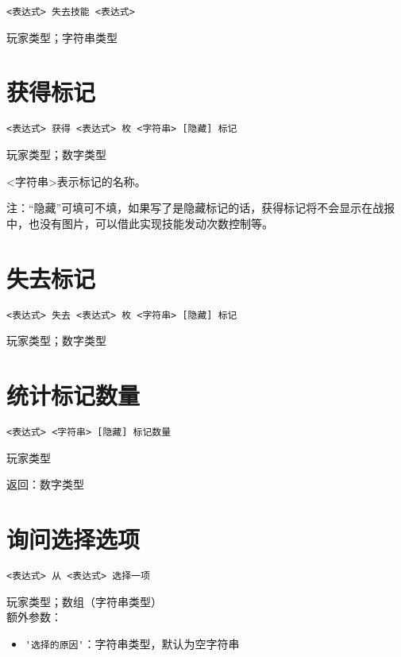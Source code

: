 \begin{verbatim}
<表达式> 失去技能 <表达式>
\end{verbatim}

玩家类型；字符串类型

\section{获得标记}

\begin{verbatim}
<表达式> 获得 <表达式> 枚 <字符串> [隐藏] 标记
\end{verbatim}

玩家类型；数字类型

<字符串>表示标记的名称。

注：“隐藏”可填可不填，如果写了是隐藏标记的话，获得标记将不会显示在战报中，也没有图片，可以借此实现技能发动次数控制等。

\section{失去标记}

\begin{verbatim}
<表达式> 失去 <表达式> 枚 <字符串> [隐藏] 标记
\end{verbatim}

玩家类型；数字类型

\section{统计标记数量}

\begin{verbatim}
<表达式> <字符串> [隐藏] 标记数量
\end{verbatim}

玩家类型

返回：数字类型

\section{询问选择选项}

\begin{verbatim}
<表达式> 从 <表达式> 选择一项
\end{verbatim}

玩家类型；数组（字符串类型） \\

额外参数：

\begin{itemize}
  \item \verb|'选择的原因'|：字符串类型，默认为空字符串
\end{itemize}

